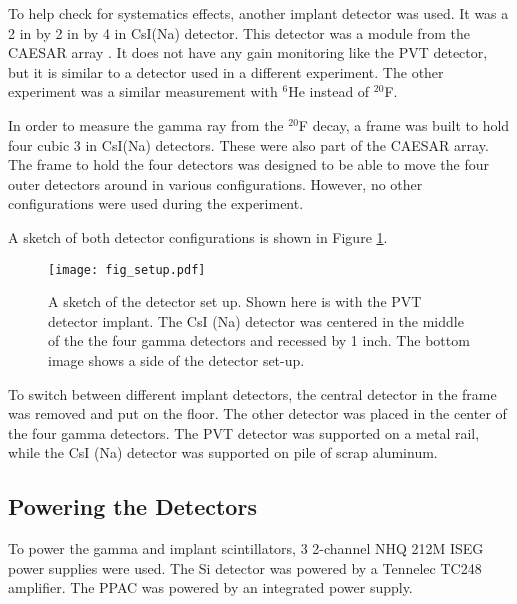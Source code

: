 To help check for systematics effects, another implant detector was used.
It was a 2 in by 2 in by 4 in  CsI(Na) detector. 
This detector was a module from the CAESAR array \cite{Wei10}.
It does not have any gain monitoring like the PVT detector, but it is similar to a detector used in a different experiment. 
The other experiment was a similar measurement with $^{6}$He instead of $^{20}$F.

In order to measure the gamma ray from the $^{20}$F decay, a frame was built to hold four cubic 3 in CsI(Na) detectors.  
These were also part of the CAESAR array.
The frame to hold the four detectors was designed to be able to move the four outer detectors around in various configurations.
However, no other configurations were used during the experiment. 

A sketch of both detector configurations is shown in Figure \ref{fig:detsketch}.

\begin{figure}
	\texttt{[image: fig\_setup.pdf]}
	\caption{A sketch of the detector set up. 
	Shown here is with the PVT detector implant.
	The CsI (Na) detector was centered in the middle of the the four gamma detectors and recessed by 1 inch.
	The bottom image shows a side of the detector set-up.}
	\label{fig:detsketch}
\end{figure}

To switch between different implant detectors, the central detector in the frame was removed and put on the floor.
The other detector was placed in the center of the four gamma detectors.
The PVT detector was supported on a metal rail, while the CsI (Na) detector was supported on pile of scrap aluminum.

\subsection{Powering the Detectors}

To power the gamma and implant scintillators, 3 2-channel NHQ 212M ISEG power supplies were used.
The Si detector was powered by a Tennelec TC248 amplifier.
The PPAC was powered by an integrated power supply.

